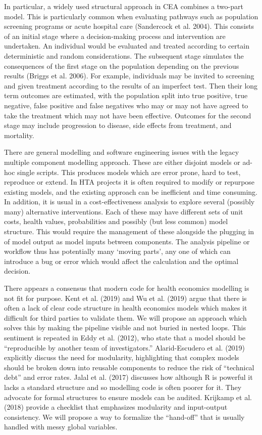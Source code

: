 \documentclass[
]{article}
\begin{document}
In particular, a widely used structural approach in CEA combines a
two-part model. This is particularly common when evaluating pathways
such as population screening programs or acute hospital care (Sandercock
et al. 2004). This consists of an initial stage where a decision-making
process and intervention are undertaken. An individual would be
evaluated and treated according to certain deterministic and random
considerations. The subsequent stage simulates the consequences of the
first stage on the population depending on the previous results (Briggs
et al. 2006). For example, individuals may be invited to screening and
given treatment according to the results of an imperfect test. Then
their long term outcomes are estimated, with the population split into
true positive, true negative, false positive and false negatives who may
or may not have agreed to take the treatment which may not have been
effective. Outcomes for the second stage may include progression to
disease, side effects from treatment, and mortality.

There are general modelling and software engineering issues with the
legacy multiple component modelling approach. These are either disjoint
models or ad-hoc single scripts. This produces models which are error
prone, hard to test, reproduce or extend. In HTA projects it is often
required to modify or repurpose existing models, and the existing
approach can be inefficient and time consuming. In addition, it is usual
in a cost-effectiveness analysis to explore several (possibly many)
alternative interventions. Each of these may have different sets of unit
costs, health values, probabilities and possibly (but less common) model
structure. This would require the management of these alongside the
plugging in of model output as model inputs between components. The
analysis pipeline or workflow thus has potentially many `moving parts',
any one of which can introduce a bug or error which would affect the
calculation and the optimal decision.

There appears a consensus that modern code for health economics
modelling is not fit for purpose. Kent et al. (2019) and Wu et al.
(2019) argue that there is often a lack of clear code structure in
health economics models which makes it difficult for third parties to
validate them. We will propose an approach which solves this by making
the pipeline visible and not buried in nested loops. This sentiment is
repeated in Eddy et al. (2012), who state that a model should be
``reproducible by another team of investigators.'' Alarid-Escudero et
al. (2019) explicitly discuss the need for modularity, highlighting that
complex models should be broken down into reusable components to reduce
the risk of ``technical debt'' and error rates. Jalal et al. (2017)
discusses how although R is powerful it lacks a standard structure and
so modelling code is often poorer for it. They advocate for formal
structures to ensure models can be audited. Krijkamp et al. (2018)
provide a checklist that emphasizes modularity and input-output
consistency. We will propose a way to formalize the ``hand-off'' that is
usually handled with messy global variables.
\end{document}
